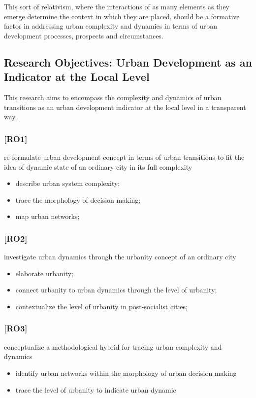 \documentclass[11pt]{report}
\begin{document}
{{This sort of relativism, where the interactions of as many elements as they emerge determine the context in which they are placed, should be a formative factor in addressing urban complexity and dynamics in terms of urban development processes, prospects and circumstances.

\subsection{Research Objectives: Urban Development as an Indicator at the Local Level}

This research aims to encompass the complexity and dynamics of urban transitions as an urban development indicator at the local level in a transparent way.

\subsubsection{[RO1]}
re-formulate urban development concept in terms of urban transitions to fit the idea of dynamic state of an ordinary city in its full complexity
\begin{itemize}
\item describe urban system complexity;
\item trace the morphology of decision making;
\item map urban networks;
\end{itemize}

\subsubsection{[RO2]}
investigate urban dynamics through the urbanity concept of an ordinary city
\begin{itemize}
\item elaborate urbanity;
\item connect urbanity to urban dynamics through the level of urbanity;
\item contextualize the level of urbanity in post-socialist cities;
\end{itemize}

\subsubsection{[RO3]}
conceptualize a methodological hybrid for tracing urban complexity and dynamics
\begin{itemize}
\item identify urban networks within the morphology of urban decision making
\item trace the level of urbanity to indicate urban dynamic
\end{itemize}

}}
\end{document}
